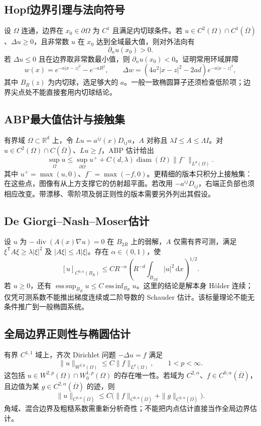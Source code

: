 \documentclass[../main.tex]{subfiles}
\begin{document}
\subsection{Hopf边界引理与法向符号}
设 $\Omega$ 连通，边界在 $x_0\in\partial\Omega$ 为 $C^1$ 且满足内切球条件。若 $u\in C^2(\Omega)\cap C^1(\overline\Omega)$、$\Delta u\ge0$，且非常数 $u$ 在 $x_0$ 达到全域最大值，则对外法向有
\[
\partial_nu(x_0)>0.
\]
若 $\Delta u\le0$ 且在边界取非常数最小值，则 $\partial_nu(x_0)<0$。证明常用环域屏障
\[
w(x)=e^{-a|x-z|^2}-e^{-aR^2},\qquad
\Delta w=(4a^2|x-z|^2-2ad)e^{-a|x-z|^2},
\]
其中 $B_R(z)$ 为内切球，选足够大的 $a$。一般一致椭圆算子还须检查低阶项；边界尖点处不能直接套用内切球结论。
\subsection{ABP最大值估计与接触集}
有界域 $\Omega\subset\mathbb R^d$ 上，令 $Lu=a^{ij}(x)D_{ij}u$，$A$ 对称且 $\lambda I\le A\le\Lambda I$。对 $u\in C^2(\Omega)\cap C(\overline\Omega)$、$Lu\ge f$，ABP 估计给出
\[
\sup_\Omega u\le\sup_{\partial\Omega}u^+
+C(d,\lambda)\operatorname{diam}(\Omega)\|f^-\|_{L^d(\Omega)}.
\]
其中 $u^+=\max(u,0)$、$f^-=\max(-f,0)$。更精细的版本只积分上接触集：在这些点，图像有从上方支撑它的仿射超平面。若改用 $-a^{ij}D_{ij}$，右端正负部也须相应改变。带漂移、零阶项及弱正则性的版本需要另外列出其假设。
\subsection{De Giorgi--Nash--Moser估计}
设 $u$ 为 $-\operatorname{div}(A(x)\nabla u)=0$ 在 $B_{2R}$ 上的弱解，$A$ 仅需有界可测，满足 $\xi^{\mathsf T}A\xi\ge\lambda|\xi|^2$ 及 $|A\xi|\le\Lambda|\xi|$。存在 $\alpha\in(0,1)$，使
\[
[u]_{C^{0,\alpha}(B_R)}
\le CR^{-\alpha}\left(R^{-d}\int_{B_{2R}}|u|^2\,\mathrm dx\right)^{1/2}.
\]
若 $u\ge0$，还有 $\operatorname*{ess\,sup}_{B_R}u\le C\operatorname*{ess\,inf}_{B_R}u$。这里的结论是解本身 Hölder 连续；仅凭可测系数不能推出梯度连续或二阶导数的 Schauder 估计。该标量理论不能无条件推广到一般椭圆系统。
\subsection{全局边界正则性与椭圆估计}
有界 $C^{1,1}$ 域上，齐次 Dirichlet 问题 $-\Delta u=f$ 满足
\[
\|u\|_{W^{2,p}(\Omega)}\le C\|f\|_{L^p(\Omega)},\qquad1<p<\infty.
\]
这包括 $u\in W^{2,p}(\Omega)\cap W_0^{1,p}(\Omega)$ 的存在唯一性。若域为 $C^{2,\alpha}$、$f\in C^{0,\alpha}(\overline\Omega)$，且边值为某 $g\in C^{2,\alpha}(\overline\Omega)$ 的迹，则
\[
\|u\|_{C^{2,\alpha}(\overline\Omega)}
\le C\bigl(\|f\|_{C^{0,\alpha}(\overline\Omega)}
+\|g\|_{C^{2,\alpha}(\overline\Omega)}\bigr).
\]
角域、混合边界及粗糙系数需重新分析奇性；不能把内点估计直接当作全局边界估计。
\end{document}
